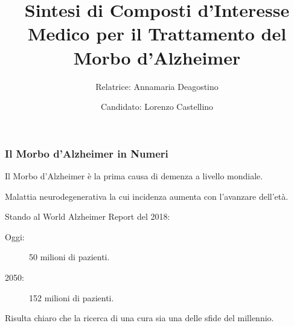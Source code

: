 \documentclass[9pt]{beamer}
\title{Sintesi di Composti d'Interesse Medico per il Trattamento del Morbo d'Alzheimer}
\author{
	Relatrice: Annamaria Deagostino \\
	\and
	Candidato: Lorenzo Castellino
}
\date{\center{Anno Accademico 2017-2018}}
\begin{document}
\begin{frame}

	\titlepage
\end{frame}

\begin{frame}
	\frametitle{Il Morbo d'Alzheimer in Numeri}
	Il Morbo d'Alzheimer è la prima causa di demenza a livello mondiale.
	
	Malattia neurodegenerativa la cui incidenza aumenta con l'avanzare dell'età.
	
	Stando al World Alzheimer Report del 2018:
	
	\begin{description}
		\item [Oggi:] 50 milioni di pazienti.
		      
		\item [2050:] 152 milioni di pazienti.
		      
	\end{description}
	
	Risulta chiaro che la ricerca di una cura sia una delle sfide del millennio.
\end{frame}
\end{document}
